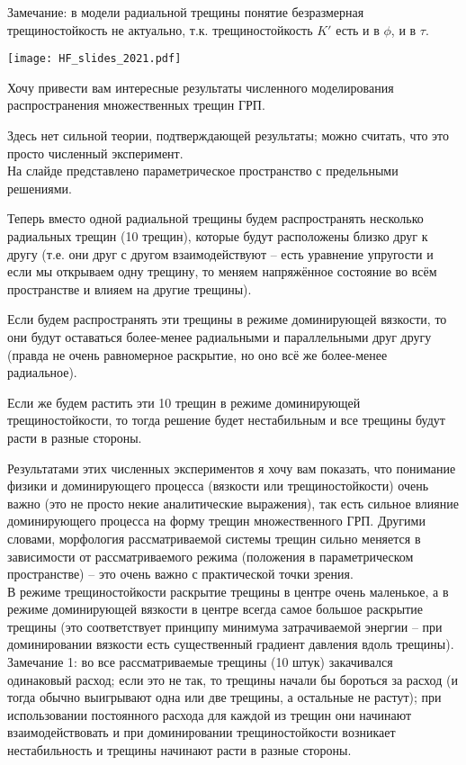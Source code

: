 \documentclass[main.tex]{subfiles}
\begin{document}
Замечание: в модели радиальной трещины понятие безразмерная трещиностойкость не актуально, т.к. трещиностойкость $K'$ есть и в $\phi$, и в $\tau$.

\texttt{[image: HF\_slides\_2021.pdf]}

Хочу привести вам интересные результаты численного моделирования распространения множественных трещин ГРП.

Здесь нет сильной теории, подтверждающей результаты; можно считать, что это просто численный эксперимент.
\\

На слайде представлено параметрическое пространство с предельными решениями.

Теперь вместо одной радиальной трещины будем распространять несколько радиальных трещин (10 трещин), которые будут расположены близко друг к другу (т.е. они друг с другом взаимодействуют -- есть уравнение упругости и если мы открываем одну трещину, то меняем напряжённое состояние во всём пространстве и влияем на другие трещины).

Если будем распространять эти трещины в режиме доминирующей вязкости, то они будут оставаться более-менее радиальными и параллельными друг другу (правда не очень равномерное раскрытие, но оно всё же более-менее радиальное).

Если же будем растить эти 10 трещин в режиме доминирующей трещиностойкости, то тогда решение будет нестабильным и все трещины будут расти в разные стороны.

Результатами этих численных экспериментов я хочу вам показать, что понимание физики и доминирующего процесса (вязкости или трещиностойкости) очень важно (это не просто некие аналитические выражения), так есть сильное влияние доминирующего процесса на форму трещин множественного ГРП.
Другими словами, морфология рассматриваемой системы трещин сильно меняется в зависимости от рассматриваемого режима (положения в параметрическом пространстве) -- это очень важно с практической точки зрения.
\\

В режиме трещиностойкости раскрытие трещины в центре очень маленькое, а в режиме доминирующей вязкости в центре всегда самое большое раскрытие трещины (это соответствует принципу минимума затрачиваемой энергии -- при доминировании вязкости есть существенный градиент давления вдоль трещины).
\\

Замечание 1: во все рассматриваемые трещины (10 штук) закачивался одинаковый расход; если это не так, то трещины начали бы бороться за расход (и тогда обычно выигрывают одна или две трещины, а остальные не растут); при использовании постоянного расхода для каждой из трещин они начинают взаимодействовать и при доминировании трещиностойкости возникает нестабильность и трещины начинают расти в разные стороны.
\\
\end{document}
